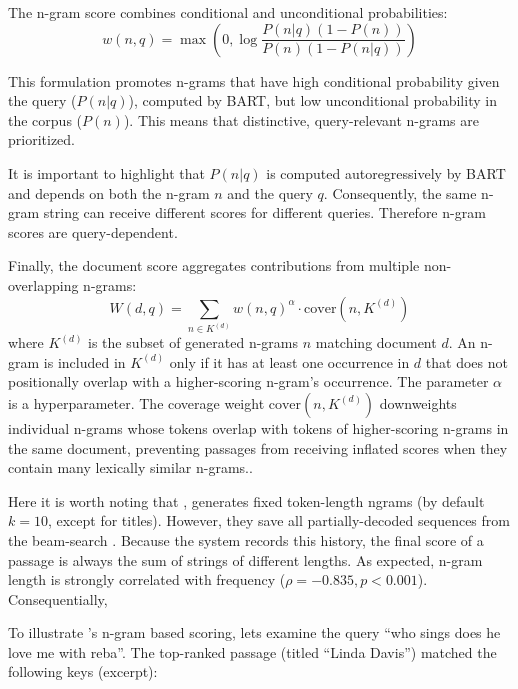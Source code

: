 The n-gram score combines conditional and unconditional probabilities:
\begin{equation}
    w(n, q) = \max\left(0, \log \frac{P(n|q)(1 - P(n))}{P(n)(1 - P(n|q))}\right)
    \label{eq:ngram-score}
\end{equation}

This formulation promotes n-grams that have high conditional probability given the query ($P(n|q)$), computed by BART, but low unconditional probability in the corpus ($P(n)$). This means that distinctive, query-relevant n-grams are prioritized.

It is important to highlight that $P(n|q)$ is computed autoregressively by BART and depends on both the n-gram $n$ and the query $q$. Consequently, the same n-gram string can receive different scores for different queries. Therefore n-gram scores are query-dependent.

Finally, the document score aggregates contributions from multiple non-overlapping n-grams:
\begin{equation}
    W(d, q) = \sum_{n \in K^{(d)}} w(n, q)^\alpha \cdot \text{cover}(n, K^{(d)})
    \label{eq:doc-score}
\end{equation}
where $K^{(d)}$ is the subset of generated n-grams $n$ matching document $d$. 
An n-gram is included in $K^{(d)}$ only if it has at least one occurrence 
in $d$ that does not positionally overlap with a higher-scoring n-gram's 
occurrence. The parameter $\alpha$ is a hyperparameter. The coverage weight $\text{cover}(n, K^{(d)})$ downweights individual n-grams whose tokens overlap with tokens of higher-scoring n-grams in the same document, preventing passages from receiving inflated scores when they contain many lexically similar n-grams.\cite{michele-bevilacqua-autoregressive-search}.

Here it is worth noting that , generates fixed token-length ngrams (by default $k=10$, except for titles). However, they save all partially-decoded sequences from the beam-search \cite{michele-bevilacqua-autoregressive-search}. Because the system records this history, the final score of a passage is always the sum of strings of different lengths. As expected, n-gram length is strongly correlated with frequency ($\rho=-0.835, p<0.001$). Consequentially, 

To illustrate 's n-gram based scoring, lets examine the query ``who sings does he love me with reba''. The top-ranked passage (titled ``Linda Davis'') matched the following keys (excerpt):

